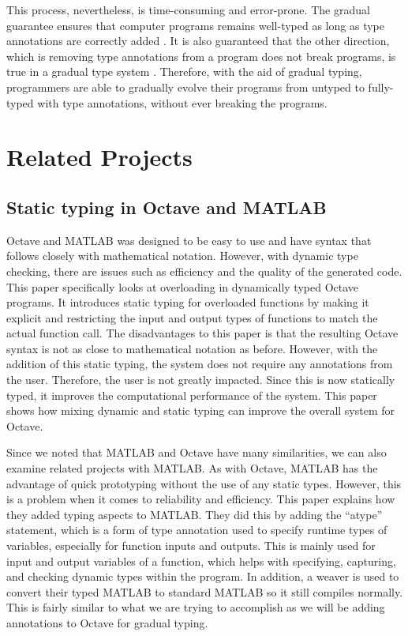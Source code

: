 This process, nevertheless, is time-consuming and error-prone. The gradual guarantee ensures that computer programs remains well-typed as long as type annotations are correctly added \cite{siek2015refined}. It is also guaranteed that the other direction, which is removing type annotations from a program does not break programs, is true in a gradual type system \cite{siek2015refined}. Therefore, with the aid of gradual typing, programmers are able to gradually evolve their programs from untyped to fully-typed with type annotations, without ever breaking the programs.

\section{Related Projects}
\subsection{Static typing in Octave and MATLAB}
Octave and MATLAB was designed to be easy to use and have syntax that follows closely with mathematical notation. However, with dynamic type checking, there are issues such as efficiency and the quality of the generated code. This paper \cite{olmos2003turning} specifically looks at overloading in dynamically typed Octave programs. It introduces static typing for overloaded functions by making it explicit and restricting the input and output types of functions to match the actual function call. The disadvantages to this paper is that the resulting Octave syntax is not as close to mathematical notation as before. However, with the addition of this static typing, the system does not require any annotations from the user. Therefore, the user is not greatly impacted. Since this is now statically typed, it improves the computational performance of the system. This paper shows how mixing dynamic and static typing can improve the overall system for Octave.

Since we noted that MATLAB and Octave have many similarities, we can also examine related projects with MATLAB. As with Octave, MATLAB has the advantage of quick prototyping without the use of any static types. However, this is a problem when it comes to reliability and efficiency. This paper \cite{hendren2011typing} explains how they added typing aspects to MATLAB. They did this by adding the “atype” statement, which is a form of type annotation used to specify runtime types of variables, especially for function inputs and outputs. This is mainly used for input and output variables of a function, which helps with specifying, capturing, and checking dynamic types within the program. In addition, a weaver is used to convert their typed MATLAB to standard MATLAB so it still compiles normally. This is fairly similar to what we are trying to accomplish as we will be adding annotations to Octave for gradual typing.

